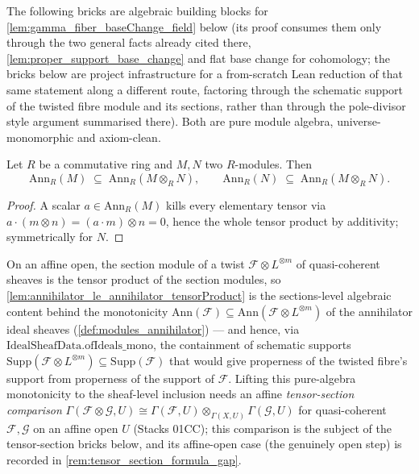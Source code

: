 The following bricks are algebraic building blocks for
\cref{lem:gamma_fiber_baseChange_field} below (its proof consumes them only
through the two general facts already cited there,
\cref{lem:proper_support_base_change} and flat base change for cohomology;
the bricks below are project infrastructure for a from-scratch Lean
reduction of that same statement along a different route, factoring through
the schematic support of the twisted fibre module and its sections, rather
than through the pole-divisor style argument summarised there). Both are
pure module algebra, universe-monomorphic and axiom-clean.

\begin{lemma}\leanok
  \label{lem:annihilator_le_annihilator_tensorProduct}
  Let \(R\) be a commutative ring and \(M, N\) two \(R\)-modules. Then
  \[
    \mathrm{Ann}_R(M) \;\subseteq\; \mathrm{Ann}_R(M \otimes_R N),
    \qquad
    \mathrm{Ann}_R(N) \;\subseteq\; \mathrm{Ann}_R(M \otimes_R N).
  \]
\end{lemma}
\begin{proof}\leanok
  A scalar \(a \in \mathrm{Ann}_R(M)\) kills every elementary tensor via
  \(a \cdot (m \otimes n) = (a \cdot m) \otimes n = 0\), hence the whole tensor
  product by additivity; symmetrically for \(N\).
\end{proof}

\begin{remark}
  \label{rem:annihilator_tensorProduct_support}
  On an affine open, the section module of a twist \(\mathcal F \otimes
  L^{\otimes m}\) of quasi-coherent sheaves is the tensor product of the
  section modules, so \cref{lem:annihilator_le_annihilator_tensorProduct}
  is the sections-level algebraic content behind the monotonicity
  \(\mathrm{Ann}(\mathcal F) \subseteq \mathrm{Ann}(\mathcal F \otimes
  L^{\otimes m})\) of the annihilator ideal sheaves
  (\cref{def:modules_annihilator}) --- and hence, via
  \(\mathrm{IdealSheafData.ofIdeals\_mono}\), the containment of schematic
  supports \(\mathrm{Supp}(\mathcal F \otimes L^{\otimes m}) \subseteq
  \mathrm{Supp}(\mathcal F)\) that would give properness of the twisted
  fibre's support from properness of the support of \(\mathcal F\). Lifting
  this pure-algebra monotonicity to the sheaf-level inclusion needs an
  affine \emph{tensor-section comparison}
  \(\Gamma(\mathcal F \otimes \mathcal G, U) \cong \Gamma(\mathcal F, U)
  \otimes_{\Gamma(X, U)} \Gamma(\mathcal G, U)\) for quasi-coherent
  \(\mathcal F, \mathcal G\) on an affine open \(U\) (Stacks 01CC); this
  comparison is the subject of the tensor-section bricks below, and its
  affine-open case (the genuinely open step) is recorded in
  \cref{rem:tensor_section_formula_gap}.
\end{remark}

